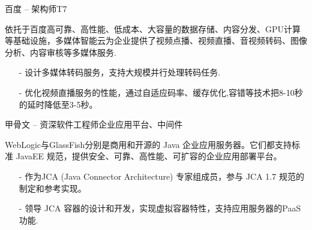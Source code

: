 \documentclass[10pt,a4paper]{moderncv}
\begin{document}
\pagebreak
	{ 百度 -- 架构师}{T7}{}{}{}
	\vspace{1ex}

{
	 依托于百度高可靠、高性能、低成本、大容量的数据存储、内容分发、GPU计算等基础设施，多媒体智能云为企业提供了视频点播、视频直播、音视频转码、图像分析、内容审核等多媒体服务.
	 \begin{itemize}
		\item[-] 设计多媒体转码服务，支持大规模并行处理转码任务.
		\item[-] 优化视频直播服务的性能，通过自适应码率、缓存优化,容错等技术把8-10秒的延时降低至3-5秒。
	 \end{itemize}
}

\vspace{2ex}
\vspace*{0.4\baselineskip}

{ 甲骨文 -- 资深软件工程师}{企业应用平台、中间件}{}{}{}
\vspace{1ex}
{
  WebLogic与GlassFish分别是商用和开源的 Java 企业应用服务器。它们都支持标准 JavaEE 规范，提供安全、可靠、高性能、可扩容的企业应用部署平台。
  \begin{itemize}
    \item[-] 作为JCA (Java Connector Architecture) 专家组成员，参与 JCA 1.7 规范的制定和参考实现。
    \item[-] 领导 JCA 容器的设计和开发，实现虚拟容器特性，支持应用服务器的PaaS功能.
  \end{itemize}
}

\vspace{2ex}
\vspace*{0.4\baselineskip}
\end{document}
